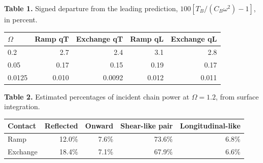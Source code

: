 {\small\textbf{Table 1.} Signed departure from the leading prediction, $100[T_B/(C_B\omega^2)-1]$, in percent.\par}
\begin{tabular}{lrrrr}
$\Omega$ & Ramp qT & Exchange qT & Ramp qL & Exchange qL\\
\midrule
0.2 & 2.7 & 2.4 & 3.1 & 2.8\\
0.05 & 0.17 & 0.15 & 0.19 & 0.17\\
0.0125 & 0.010 & 0.0092 & 0.012 & 0.011\\
\end{tabular}

{\small\textbf{Table 2.} Estimated percentages of incident chain power at $\Omega=1.2$, from surface integration.\par}
\begin{tabular}{lrrrr}
Contact & Reflected & Onward & Shear-like pair & Longitudinal-like\\
\midrule
Ramp & 12.0\% & 7.6\% & 73.6\% & 6.8\%\\
Exchange & 18.4\% & 7.1\% & 67.9\% & 6.6\%\\
\end{tabular}
